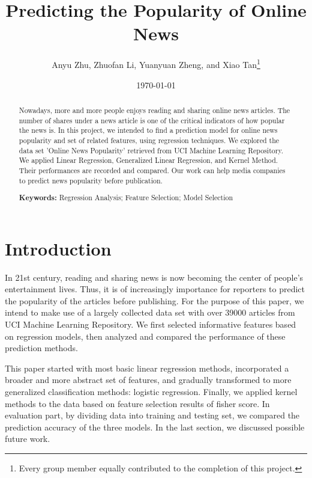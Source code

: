 \documentclass[letterpaper,12pt]{article}
\begin{document}
\title{Predicting the Popularity of Online News}
\author{Anyu Zhu, Zhuofan Li, Yuanyuan Zheng, and Xiao Tan\footnote{Every group member equally contributed to the completion of this project.}}
\date{\today}
\maketitle

\begin{abstract}
Nowadays, more and more people enjoys reading and sharing online news articles. The number of shares under a news article is one of the critical indicators of how popular the news is. In this project, we intended to find a prediction model for online news popularity and set of related features, using regression techniques. We explored the data set 'Online News Popularity' retrieved from UCI Machine Learning Repository. We applied Linear Regression, Generalized Linear Regression, and Kernel Method. Their performances are recorded and compared. Our work can help media companies to predict news popularity before publication.

\textbf{Keywords: } Regression Analysis; Feature Selection; Model Selection

\end{abstract}

\newpage
\tableofcontents

\newpage
\section{Introduction}
In 21st century, reading and sharing news is now becoming the center of people’s entertainment lives. Thus, it is of increasingly importance for reporters to predict the popularity of the articles before publishing. For the purpose of this paper, we intend to make use of a largely collected data set with over 39000 articles from UCI Machine Learning Repository. We first selected informative features based on regression models, then analyzed and compared the performance of these prediction methods.

This paper started with most basic linear regression methods, incorporated a broader and more abstract set of features, and gradually transformed to more generalized classification methods: logistic regression. Finally, we applied kernel methods to the data based on feature selection results of fisher score. In evaluation part, by dividing data into training and testing set, we compared the prediction accuracy of the three models. In the last section, we discussed possible future work.
\end{document}
